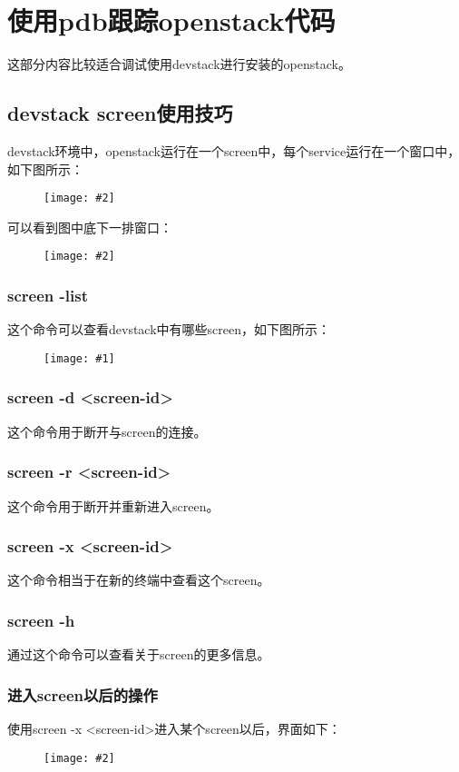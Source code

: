 \documentclass[a4paper,left=1.5cm,right=1.5cm,11pt]{article}
\newcommand{\fic}[1]{\begin{figure}[H]
		\center
		\texttt{[image: \#1]}
	\end{figure}}
\newcommand{\sizedfic}[2]{\begin{figure}[H]
		\center
		\texttt{[image: \#2]}
	\end{figure}}
\begin{document}
\tableofcontents

\clearpage

\section{使用pdb跟踪openstack代码}
	这部分内容比较适合调试使用devstack进行安装的openstack。\par

\subsection{devstack screen使用技巧}
	devstack环境中，openstack运行在一个screen中，每个service运行在一个窗口中，如下图所示：
	\sizedfic{1}{1.png}

	可以看到图中底下一排窗口：
	\sizedfic{1}{2.png}

\subsubsection{screen -list}
	这个命令可以查看devstack中有哪些screen，如下图所示：
	\fic{3.png}

\subsubsection{screen -d <screen-id>}
	这个命令用于断开与screen的连接。

\subsubsection{screen -r <screen-id>}
	这个命令用于断开并重新进入screen。

\subsubsection{screen -x <screen-id>}
	这个命令相当于在新的终端中查看这个screen。

\subsubsection{screen -h}
	通过这个命令可以查看关于screen的更多信息。

\subsubsection{进入screen以后的操作}
	使用screen -x <screen-id>进入某个screen以后，界面如下：
	\sizedfic{1}{1.png}
\end{document}
